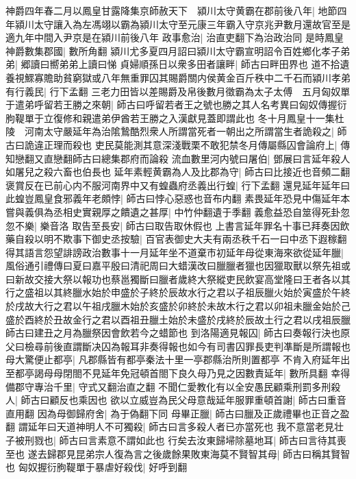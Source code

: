 神爵四年春二月以鳳皇甘露降集京師赦天下　潁川太守黄霸在郡前後八年|{
	地節四年潁川太守讓入為左馮翊以霸為潁川太守至元康三年霸入守京兆尹數月還故官至是適九年中間入尹京是在潁川前後八年}
政事愈治|{
	治直吏翻下為治政治同}
是時鳳皇神爵數集郡國|{
	數所角翻}
潁川尤多夏四月詔曰潁川太守霸宣明詔令百姓鄉化孝子弟弟|{
	郷讀曰嚮弟弟上讀曰悌}
貞婦順孫日以衆多田者讓畔|{
	師古曰畔田界也}
道不拾遺養視鰥寡贍助貧窮獄或八年無重罪囚其賜爵關内侯黄金百斤秩中二千石而潁川孝弟有行義民|{
	行下孟翻}
三老力田皆以差賜爵及帛後數月徵霸為太子太傅　五月匈奴單于遣弟呼留若王勝之來朝|{
	師古曰呼留若者王之號也勝之其人名考異曰匈奴傳握衍朐鞮單于立復修和親遣弟伊酋若王勝之入漢獻見蓋即謂此也}
冬十月鳳皇十一集杜陵　河南太守嚴延年為治隂鷙酷烈衆人所謂當死者一朝出之所謂當生者詭殺之|{
	師古曰詭違正理而殺也}
吏民莫能測其意深淺戰栗不敢犯禁冬月傳屬縣囚會論府上|{
	傳知戀翻又直戀翻師古曰總集郡府而論殺}
流血數里河内號曰屠伯|{
	鄧展曰言延年殺人如屠兒之殺六畜也伯長也}
延年素輕黄霸為人及比郡為守|{
	師古曰比接近也音頻二翻}
褒賞反在已前心内不服河南界中又有蝗蟲府丞義出行蝗|{
	行下孟翻}
還見延年延年曰此蝗豈鳳皇食邪義年老頗悖|{
	師古曰悖心惡惑也音布内翻}
素畏延年恐見中傷延年本嘗與義俱為丞相史實親厚之饋遺之甚厚|{
	中竹仲翻遺于季翻}
義愈益恐自筮得死卦忽忽不樂|{
	樂音洛}
取告至長安|{
	師古曰取告取休假也}
上書言延年罪名十事已拜奏因飲藥自殺以明不欺事下御史丞按驗|{
	百官表御史大夫有兩丞秩千石一曰中丞下遐稼翻}
得其語言怨望誹謗政治數事十一月延年坐不道棄市初延年母從東海來欲從延年臘|{
	風俗通引禮傳曰夏曰嘉平殷曰清祀周曰大蜡漢改曰臘臘者獵也因獵取獸以祭先祖或曰新故交接大祭以報功也蔡邕獨斷曰臘者歲終大祭縱吏民飲宴高堂隆曰王者各以其行之盛祖以其終臘水始於申盛於子終於辰故水行之君以子祖辰臘火始於寅盛於午終於戌故大行之君以午祖戌臘木始於亥盛於卯終於未故木行之君以卯祖未臘金始於己盛於酉終於丑故金行之君以酉祖丑臘土始於未盛於戌終於辰故土行之君以戌祖辰臘師古曰建丑之月為臘祭因會飲若今之蜡節也}
到洛陽適見報囚|{
	師古曰奏報行決也原父曰檢尋前後直謂斷决囚為報耳非奏得報也如今有司書囚罪長吏判凖斷是所謂報也}
母大驚便止都亭|{
	凡郡縣皆有都亭秦法十里一亭郡縣治所則置都亭}
不肯入府延年出至都亭謁母母閉閤不見延年免冠頓首閤下良久母乃見之因數責延年|{
	數所具翻}
幸得備郡守專治千里|{
	守式又翻治直之翻}
不聞仁愛教化有以全安愚民顧乘刑罰多刑殺人|{
	師古曰顧反也乘因也}
欲以立威豈為民父母意哉延年服罪重頓首謝|{
	師古曰重音直用翻}
因為母御歸府舍|{
	為于偽翻下同}
母畢正臘|{
	師古曰臘及正歲禮畢也正音之盈翻}
謂延年曰天道神明人不可獨殺|{
	師古曰言多殺人者已亦當死也}
我不意當老見壮子被刑戮也|{
	師古曰言素意不謂如此也}
行矣去汝東歸埽除墓地耳|{
	師古曰言待其喪至也}
遂去歸郡見昆弟宗人復為言之後歲餘果敗東海莫不賢智其母|{
	師古曰稱其賢智也}
匈奴握衍朐鞮單于暴虐好殺伐|{
	好呼到翻}
